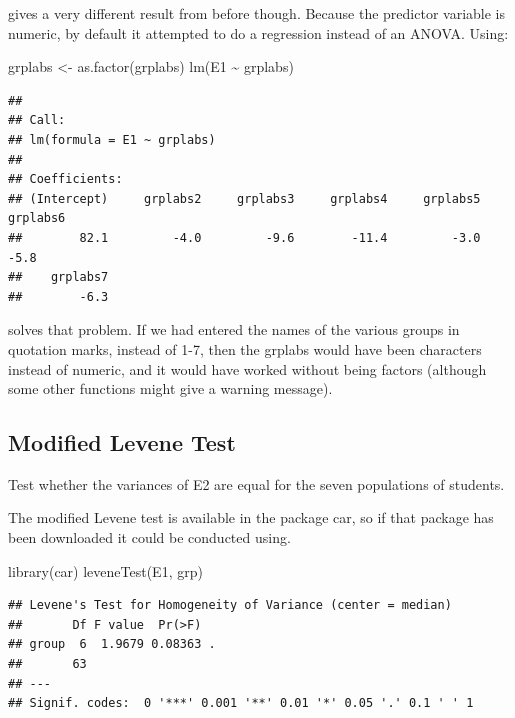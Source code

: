\documentclass[
]{book}
\newenvironment{Shaded}{\begin{snugshade}}{\end{snugshade}}
\newcommand{\FunctionTok}[1]{\textcolor[rgb]{0.00,0.00,0.00}{#1}}
\newcommand{\NormalTok}[1]{#1}
\newcommand{\OtherTok}[1]{\textcolor[rgb]{0.56,0.35,0.01}{#1}}
\newcommand{\SpecialCharTok}[1]{\textcolor[rgb]{0.00,0.00,0.00}{#1}}
\begin{document}
gives a very different result from before though. Because the predictor variable is numeric, by default it attempted to do a regression instead of an ANOVA. Using:

\begin{Shaded}
\begin{Highlighting}[]
\NormalTok{grplabs }\OtherTok{\textless{}{-}} \FunctionTok{as.factor}\NormalTok{(grplabs)}
\FunctionTok{lm}\NormalTok{(E1 }\SpecialCharTok{\textasciitilde{}}\NormalTok{ grplabs)}
\end{Highlighting}
\end{Shaded}

\begin{verbatim}
## 
## Call:
## lm(formula = E1 ~ grplabs)
## 
## Coefficients:
## (Intercept)     grplabs2     grplabs3     grplabs4     grplabs5     grplabs6  
##        82.1         -4.0         -9.6        -11.4         -3.0         -5.8  
##    grplabs7  
##        -6.3
\end{verbatim}

solves that problem. If we had entered the names of the various groups in quotation marks, instead of 1-7, then the grplabs would have been characters instead of numeric, and it would have worked without being factors (although some other functions might give a warning message).

\hypertarget{modified-levene-test}{%
\subsection{Modified Levene Test}\label{modified-levene-test}}

Test whether the variances of E2 are equal for the seven populations of students.

The modified Levene test is available in the package car, so if that package has been downloaded it could be conducted using.

\begin{Shaded}
\begin{Highlighting}[]
\FunctionTok{library}\NormalTok{(car)}
\FunctionTok{leveneTest}\NormalTok{(E1, grp)}
\end{Highlighting}
\end{Shaded}

\begin{verbatim}
## Levene's Test for Homogeneity of Variance (center = median)
##       Df F value  Pr(>F)  
## group  6  1.9679 0.08363 .
##       63                  
## ---
## Signif. codes:  0 '***' 0.001 '**' 0.01 '*' 0.05 '.' 0.1 ' ' 1
\end{verbatim}
\end{document}
